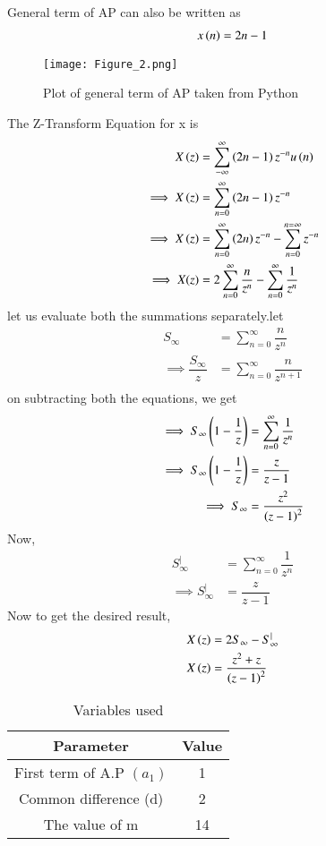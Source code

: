 \documentclass[journal,12pt,twocolumn]{IEEEtran}
\theoremstyle{remark}
\begin{document}
General term of AP can also be written as 
\begin{align}
    x\left(n\right)=2n-1
\end{align}
\begin{figure}[h]
    \centering
    \texttt{[image: Figure\_2.png]}
    \caption{Plot of general term of AP taken from Python}
    \label{fig:1}
\end{figure}
The Z-Transform Equation for x is 
\begin{align}
    X\left(z\right)&=\sum_{-\infty}^{\infty}\left(2n-1\right)z^{-n}u\left(n\right) \\
   \implies X\left(z\right)&=\sum_{n=0}^{\infty}\left(2n-1\right)z^{-n} \\
   \implies X\left(z\right)&=\sum_{n=0}^{\infty}\left(2n\right)z^{-n} -\sum_{n=0}^{n=\infty}z^{-n}\\
   \implies X(z)&=2\sum_{n=0}^{\infty}\dfrac{n}{z^{n}}-\sum_{n=0}^{\infty}\dfrac{1}{z^{n}}
\end{align}
let us evaluate both the summations separately.let
\begin{align}
   S_\infty&=\sum_{n=0}^{\infty}\dfrac{n}{z^{n}}\\
   \implies \dfrac{S_\infty}{z}&=\sum_{n=0}^{\infty}\dfrac{n}{z^{n+1}}\\
\end{align}
on subtracting both the equations, we get
\begin{align}
   \implies S_\infty\left(1-\dfrac{1}{z}\right)&=\sum_{n=0}^{\infty}\dfrac{1}{z^{n}}\\
   \implies S_\infty\left(1-\dfrac{1}{z}\right)&=\dfrac{z}{z-1}\\
   \implies S_\infty&=\dfrac{z^2}{\left(z-1\right)^{2}}
\end{align}
Now,
\begin{align}
    S_{\infty}^{|}&=\sum_{n=0}^{\infty}\dfrac{1}{z^{n}}\\
    \implies S_{\infty}^{|}&=\dfrac{z}{z-1}
\end{align}
Now to get the desired result,
\begin{align}
    X\left(z\right)&=2S_\infty-S_{\infty}^{|}\\
    X\left(z\right)&=\dfrac{z^2+z}{\left(z-1\right)^{2}}
\end{align}
\begin{table}[h!]
\begin{center}
\renewcommand\thetable{1}
\begin{tabular}{ |c|c|  } 
  \hline
    Parameter & Value  \\ 
  \hline
  First term of A.P $(a_1)$ & 1  \\ 
  \hline
  Common difference (d) & 2 \\ 
  \hline
  The value of m & 14 \\
  \hline
\end{tabular}
\end{center}
\caption{Variables used}
\end{table}
\end{document}
